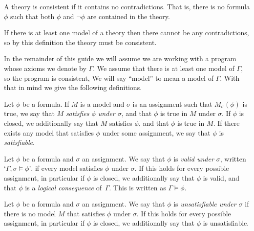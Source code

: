 \begin{definition}[Consistency]
\label{gi:consistent}
A theory is consistent if it contains no contradictions.
That is,
there is no formula $\phi$ such that
both $\phi$ and $\lnot\phi$ are contained in the theory.
\end{definition}

\noindent
If there is at least one model of a theory
then there cannot be any contradictions,
so by this definition the theory must be consistent.

In the remainder of this guide we will assume
we are working with a program
whose axioms we denote by $\Gamma$.
We assume that there is at least one model of $\Gamma$,
so the program is consistent,
We will say ``model'' to mean a model of $\Gamma$.
With that in mind we give the following definitions.

\begin{definition}[Satisfaction]
Let $\phi$ be a formula.
If $M$ is a model and $\sigma$ is an assignment
such that $M_\sigma(\phi)$ is true,
we say that $M$ \emph{satisfies $\phi$ under $\sigma$},
and that $\phi$ is true in $M$ under $\sigma$.
If $\phi$ is closed,
we additionally say that $M$ satisfies $\phi$,
and that $\phi$ is true in $M$.
If there exists any model that satisfies $\phi$ under some assignment,
we say that $\phi$ is \emph{satisfiable\label{gi:satisfiable}}.
\end{definition}

\begin{definition}[Validity]
Let $\phi$ be a formula and $\sigma$ an assignment.
We say that $\phi$ is \emph{valid\label{gi:valid} under $\sigma$},
written `$\Gamma, \sigma \models \phi$',
if every model satisfies $\phi$ under $\sigma$.
If this holds for every possible assignment,
in particular if $\phi$ is closed,
we additionally say that $\phi$ is valid,
and that $\phi$ is a \emph{logical consequence} of\, $\Gamma$.
This is written as $\Gamma \models \phi$.
\end{definition}

\begin{definition}[Unsatisfiability]
Let $\phi$ be a formula and $\sigma$ an assignment.
We say that $\phi$ is
\emph{unsatisfiable\label{gi:unsatisfiable} under $\sigma$}
if there is no model $M$ that satisfies $\phi$ under $\sigma$.
If this holds for every possible assignment,
in particular if $\phi$ is closed,
we additionally say that $\phi$ is unsatisfiable.
\end{definition}

